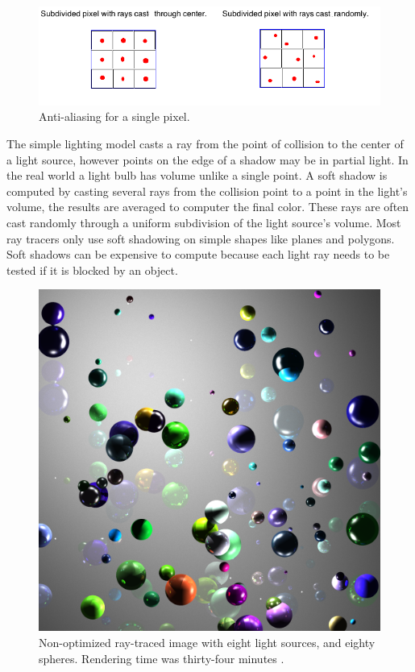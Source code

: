 \begin{figure}[H]
\includegraphics[scale=0.6]{aa.png} 
\caption{Anti-aliasing for a single pixel.}
\label{aa}
\end{figure}

 The simple lighting model casts a ray from the point of collision to the center of a light source, however points on the edge of a shadow may be in partial light.  In the real world a light bulb has volume unlike a single point.  A soft shadow is computed by casting several rays from the collision point to a point in the light's volume, the results are averaged to computer the final color.  These rays are often cast randomly through a uniform subdivision of the light source's volume.  Most ray tracers only use soft shadowing on simple shapes like planes and polygons.  Soft shadows can be expensive to compute because each light ray needs to be tested if it is blocked by an object.

\begin{figure}[H]
\begin{center}
\includegraphics[scale=0.21]{result1.png} 
\caption{Non-optimized ray-traced image with eight light sources, and eighty spheres.  Rendering time was thirty-four minutes .}
\label{result1}
\end{center}
\end{figure}

